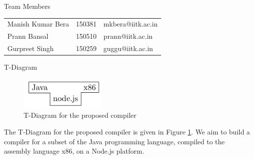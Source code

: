 \documentclass[landscape, 11pt]{article}
\begin{document}
\makeheader

\begin{qsection}{Team Members} \vspace{5mm}

	\begin{center}
		\begin{tabular}[h!]{lC{3.5cm}l}
			\hline
						&		&	 			\\
			\hline
			Manish Kumar Bera	&	150381				&	mkbera@iitk.ac.in	\\
			Prann Bansal		&	150510				&	prann@iitk.ac.in	\\
			Gurpreet Singh		&	150259				&	guggu@iitk.ac.in	\\
			\hline
		\end{tabular}
	\end{center}

\end{qsection}

\begin{qsection}{T-Diagram}

	\begin{figure}[h!]
		\centering
		\includegraphics[height=60px]{includes/t-diagram.pdf}
		\caption{T-Diagram for the proposed compiler}
		\label{fig:t-diagram}
	\end{figure}

	The T-Diagram for the proposed compiler is given in Figure \ref{fig:t-diagram}. We aim to build a compiler for a subset of the Java programming language, compiled to the assembly language x86, on a Node.js platform.

\end{qsection}

\clearpage
\end{document}
